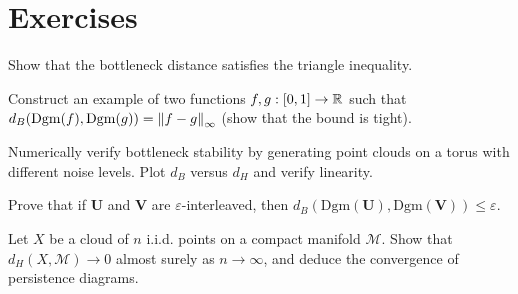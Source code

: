 \section{Exercises}

\begin{exercise}
Show that the bottleneck distance satisfies the triangle inequality.
\end{exercise}

\begin{exercise}
Construct an example of two functions $f, g : [0, 1] \to \mathbb{R}$ such that
$d_B(\mathrm{Dgm}(f), \mathrm{Dgm}(g)) = \left\| f - g \right\|_\infty$ (show
that the bound is tight).
\end{exercise}

\begin{exercise}
Numerically verify bottleneck stability by generating point clouds on a
torus with different noise levels. Plot $d_B$ versus $d_H$ and verify
linearity.
\end{exercise}

\begin{exercise}
Prove that if $\mathbf{U}$ and $\mathbf{V}$ are
$\varepsilon$-interleaved, then
$d_B(\mathrm{Dgm}(\mathbf{U}), \mathrm{Dgm}(\mathbf{V}))
\leq \varepsilon$.
\end{exercise}

\begin{exercise}
Let $X$ be a cloud of $n$ i.i.d. points on a compact manifold
$\mathcal{M}$. Show that $d_H(X, \mathcal{M}) \to 0$ almost surely as
$n \to \infty$, and deduce the convergence of persistence diagrams.
\end{exercise}
